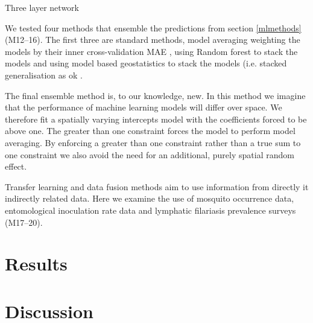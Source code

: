 \documentclass{bmcart}
\begin{document}

Three layer network



We tested four methods that ensemble the predictions from section \ref{mlmethods} (M12--16).
The first three are standard methods, model averaging weighting the models by their inner cross-validation MAE \cite{}, using Random forest to stack the models \cite{} and using model based geostatistics to stack the models (i.e. stacked generalisation as ok \cite{bhatt2016improved}.

The final ensemble method is, to our knowledge, new.
In this method we imagine that the performance of machine learning models will differ over space.
We therefore fit a spatially varying intercepts model with the coefficients forced to be above one.
The greater than one constraint forces the model to perform model averaging.
By enforcing a greater than one constraint rather than a true sum to one constraint we also avoid the need for an additional, purely spatial random effect.



Transfer learning and data fusion methods aim to use information from directly it indirectly related data.
Here we examine the use of mosquito occurrence data, entomological inoculation rate data and lymphatic filariasis prevalence surveys (M17--20).



\section*{Results}

\section{Discussion}






\end{document}
